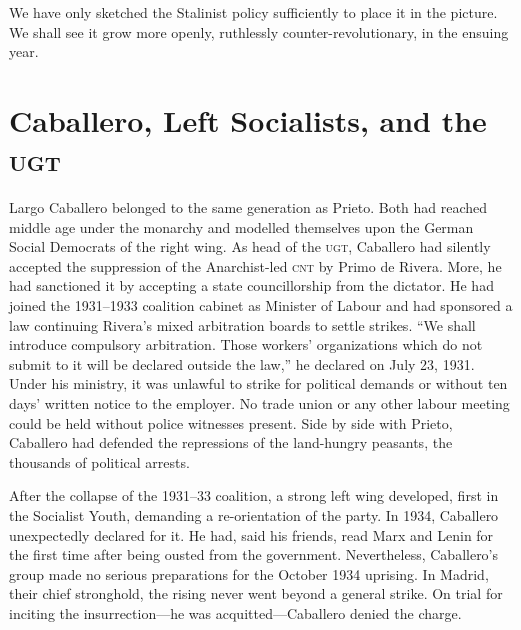 We have only sketched the Stalinist policy sufficiently to place it in the picture. We shall see it grow more openly, ruthlessly counter-revolutionary, in the ensuing year.

\section{Caballero, Left Socialists, and the \textsc{ugt}}

Largo Caballero belonged to the same generation as Prieto. Both had reached middle age under the monarchy and modelled themselves upon the German Social Democrats of the right wing. As head of the \textsc{ugt}, Caballero had silently accepted the suppression of the Anarchist-led \textsc{cnt} by Primo de Rivera. More, he had sanctioned it by accepting a state councillorship from the dictator. He had joined the 1931–1933 coalition cabinet as Minister of Labour and had sponsored a law continuing Rivera’s mixed arbitration boards to settle strikes. ``We shall introduce compulsory arbitration. Those workers’ organizations which do not submit to it will be declared outside the law,'' he declared on July 23, 1931. Under his ministry, it was unlawful to strike for political demands or without ten days’ written notice to the employer. No trade union or any other labour meeting could be held without police witnesses present. Side by side with Prieto, Caballero had defended the repressions of the land-hungry peasants, the thousands of political arrests.

After the collapse of the 1931–33 coalition, a strong left wing developed, first in the Socialist Youth, demanding a re-orientation of the party. In 1934, Caballero unexpectedly declared for it. He had, said his friends, read Marx and Lenin for the first time after being ousted from the government. Nevertheless, Caballero’s group made no serious preparations for the October 1934 uprising. In Madrid, their chief stronghold, the rising never went beyond a general strike. On trial for inciting the insurrection---he was acquitted---Caballero denied the charge.

